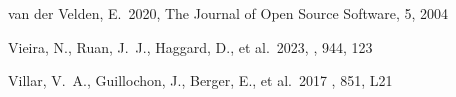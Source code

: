 \documentclass[twocolumn, twocolappendix]{aastex63}
\begin{document}
\begin{itemize}
\begin{thebibliography}{}






















 van der Velden, E.\ 2020, The Journal of Open Source Software, 5, 2004




 Vieira, N., Ruan, J.~J., Haggard, D., et al.\ 2023, \apj, 944, 123

Villar, V.~A., Guillochon, J., Berger, E., et al.\ 2017 \aj, 851, L21



\end{thebibliography}
\end{itemize}
\end{document}
